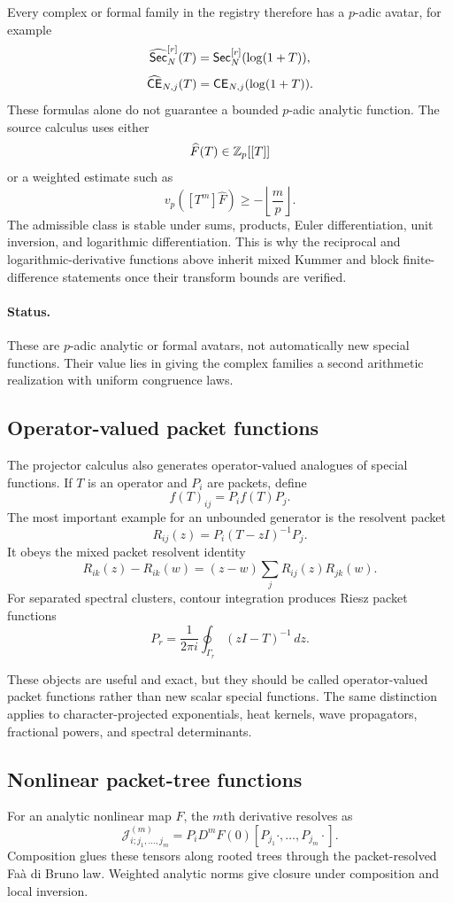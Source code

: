 Every complex or formal family in the registry therefore has a $p$-adic avatar, for example
\[
\widehat{\mathsf{Sec}}_{N}^{[r]}(T)
=\mathsf{Sec}_N^{[r]}(\log(1+T)),
\]
\[
\widehat{\mathsf{CE}}_{N,j}(T)
=\mathsf{CE}_{N,j}(\log(1+T)).
\]
These formulas alone do not guarantee a bounded $p$-adic analytic function.  The source calculus uses either
\[
\widehat F(T)\in\mathbb Z_p[[T]]
\]
or a weighted estimate such as
\[
v_p([T^m]\widehat F)\ge-\left\lfloor\frac mp\right\rfloor.
\]
The admissible class is stable under sums, products, Euler differentiation, unit inversion, and logarithmic differentiation.  This is why the reciprocal and logarithmic-derivative functions above inherit mixed Kummer and block finite-difference statements once their transform bounds are verified.

\paragraph{Status.}
These are $p$-adic analytic or formal avatars, not automatically new special functions.  Their value lies in giving the complex families a second arithmetic realization with uniform congruence laws.

\subsection{Operator-valued packet functions}

The projector calculus also generates operator-valued analogues of special functions.  If $T$ is an operator and $P_i$ are packets, define
\[
f(T)_{ij}=P_i f(T)P_j.
\]
The most important example for an unbounded generator is the resolvent packet
\[
\boxed{
R_{ij}(z)=P_i(T-zI)^{-1}P_j.
}
\]
It obeys the mixed packet resolvent identity
\[
R_{ik}(z)-R_{ik}(w)
=(z-w)\sum_jR_{ij}(z)R_{jk}(w).
\]
For separated spectral clusters, contour integration produces Riesz packet functions
\[
P_r=\frac1{2\pi i}\oint_{\Gamma_r}(zI-T)^{-1}\,dz.
\]

These objects are useful and exact, but they should be called operator-valued packet functions rather than new scalar special functions.  The same distinction applies to character-projected exponentials, heat kernels, wave propagators, fractional powers, and spectral determinants.

\subsection{Nonlinear packet-tree functions}

For an analytic nonlinear map $F$, the $m$th derivative resolves as
\[
\mathcal J^{(m)}_{i;j_1,\ldots,j_m}
=P_iD^mF(0)[P_{j_1}\cdot,\ldots,P_{j_m}\cdot].
\]
Composition glues these tensors along rooted trees through the packet-resolved Faà di Bruno law.  Weighted analytic norms give closure under composition and local inversion.

